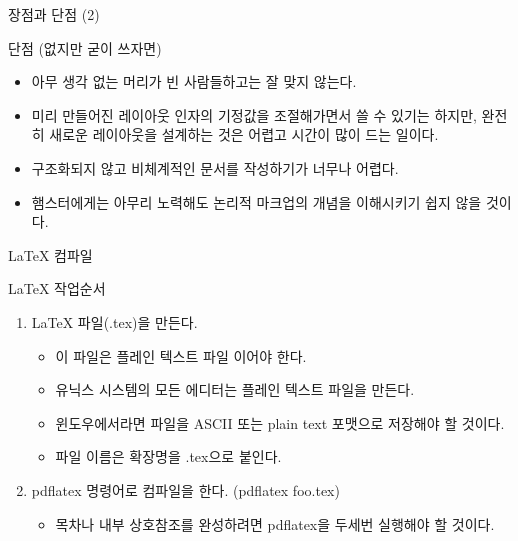 \documentclass[10pt, mathserif, aspectratio=169]{beamer}
\begin{document}
\begin{frame}{장점과 단점 (2)}
\begin{block}{단점 (없지만 굳이 쓰자면)}
  \pause
  \begin{itemize}
    \item {} 아무 생각 없는 머리가 빈 사람들하고는 잘 맞지 않는다.
    \item 미리 만들어진 레이아웃 인자의 기정값을 조절해가면서 쓸 수 있기는 하지만, 완전히 새로운 레이아웃을 설계하는 것은 어렵고 시간이 많이 드는 일이다.
    \item 구조화되지 않고 비체계적인 문서를 작성하기가 너무나 어렵다.
    \item 햄스터에게는 아무리 노력해도 논리적 마크업의 개념을 이해시키기 쉽지 않을 것이다.
  \end{itemize}
\end{block}
\end{frame}


\begin{frame}{\LaTeX{} 컴파일}
\begin{block}{\LaTeX{} 작업순서}
  \begin{enumerate}
    \item \LaTeX{} 파일(.tex)을 만든다.
    \begin{itemize}
      \item 이 파일은 플레인 텍스트 파일 이어야 한다.
      \item 유닉스 시스템의 모든 에디터는 플레인 텍스트 파일을 만든다.
      \item 윈도우에서라면 파일을 ASCII 또는 plain text 포맷으로 저장해야 할 것이다.
      \item 파일 이름은 확장명을 {\sf .tex}으로 붙인다.
    \end{itemize}
    \item {\sf pdflatex} 명령어로 컴파일을 한다. ({\sf pdflatex foo.tex})
    \begin{itemize}
      \item 목차나 내부 상호참조를 완성하려면 {\sf pdflatex}을 두세번 실행해야 할 것이다.
    \end{itemize}
  \end{enumerate}
\end{block}
\end{frame}
\end{document}
